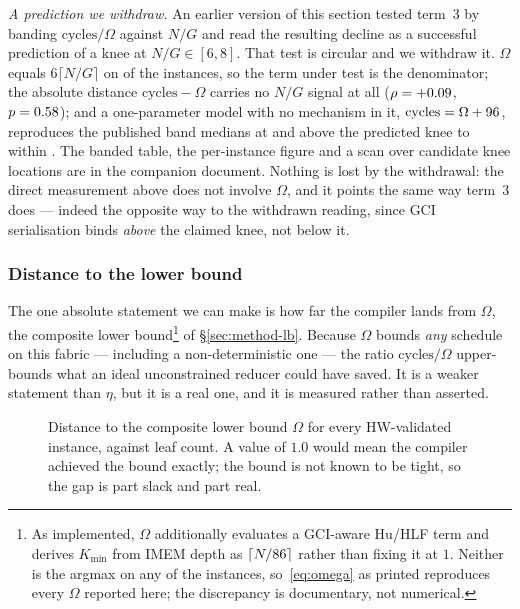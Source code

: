 \documentclass[journal,10pt]{IEEEtran}
\theoremstyle{plain}
\theoremstyle{definition}
\theoremstyle{remark}
\begin{document}
\emph{A prediction we withdraw.} An earlier version of this section tested
term~3 by banding $\mathrm{cycles}/\Omega$ against $N/G$ and read the
resulting decline as a successful prediction of a knee at $N/G \in [6,8]$.
That test is circular and we withdraw it. $\Omega$ equals $6\lceil N/G\rceil$
on \GciOmegaEq{} of the \TournNInst{} instances, so the term under test is
the denominator; the absolute distance $\mathrm{cycles}-\Omega$ carries no
$N/G$ signal at all ($\rho = +0.09{}$, $p = 0.58{}$); and a
one-parameter model with no mechanism in it, $\mathrm{cycles} = \Omega +
96{}$, reproduces the published band medians at and above the
predicted knee to within \GciNullTol{}. The banded table, the per-instance
figure and a scan over candidate knee locations are in the companion
document. Nothing is lost by the withdrawal: the direct measurement above
does not involve $\Omega$, and it points the same way term~3 does --- indeed
the opposite way to the withdrawn reading, since GCI serialisation binds
\emph{above} the claimed knee, not below it.

\subsubsection{Distance to the lower bound}

The one absolute statement we can make is how far the compiler lands from
$\Omega$, the composite lower
bound\footnote{As implemented, $\Omega$ additionally evaluates a GCI-aware Hu/HLF
  term and derives $K_{\min}$ from IMEM depth as $\lceil
  N/86\rceil$ rather than fixing it at $1$. Neither is the argmax
  on any of the \SuiteSize{} instances, so~\eqref{eq:omega} as printed
  reproduces every $\Omega$ reported here; the discrepancy is documentary,
  not numerical.} of \S\ref{sec:method-lb}.
Because $\Omega$ bounds \emph{any} schedule on this fabric --- including a
non-deterministic one --- the ratio $\text{cycles}/\Omega$ upper-bounds what
an ideal unconstrained reducer could have saved. It is a weaker statement
than $\eta$, but it is a real one, and it is measured rather than asserted.



\begin{figure}[!t]
\centering

\caption{Distance to the composite lower bound $\Omega$ for every
  HW-validated instance, against leaf count. A value of $1.0$ would mean the
  compiler achieved the bound exactly; the bound is not known to be tight, so
  the gap is part slack and part real.}
\label{fig:omegabyinst}
\end{figure}
\end{document}
